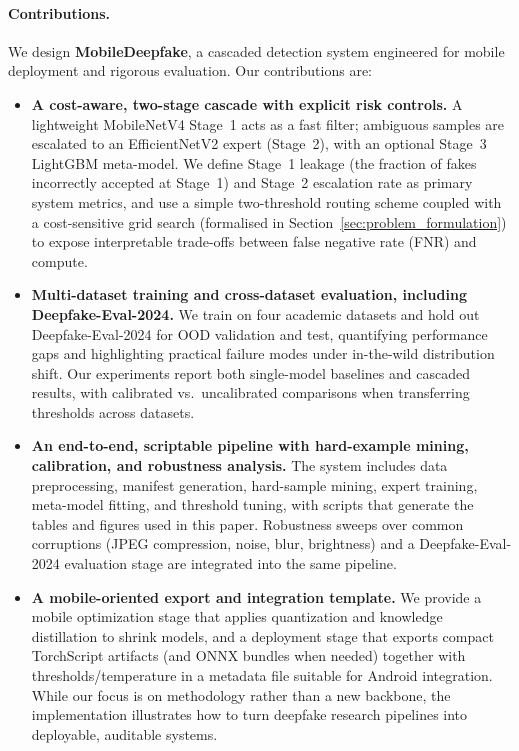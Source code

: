 \paragraph{Contributions.} We design \textbf{MobileDeepfake}, a cascaded detection system engineered for mobile deployment and rigorous evaluation. Our contributions are:
\begin{itemize}[leftmargin=*,itemsep=2pt,parsep=0pt]
  \item \textbf{A cost\hyp aware, two\hyp stage cascade with explicit risk controls.} A lightweight MobileNetV4 Stage~1 acts as a fast filter; ambiguous samples are escalated to an EfficientNetV2 expert (Stage~2), with an optional Stage~3 LightGBM meta\hyp model. We define Stage~1 leakage (the fraction of fakes incorrectly accepted at Stage~1) and Stage~2 escalation rate as primary system metrics, and use a simple two\hyp threshold routing scheme coupled with a cost\hyp sensitive grid search (formalised in Section~\ref{sec:problem_formulation}) to expose interpretable trade\hyp offs between false negative rate (FNR) and compute.
  \item \textbf{Multi\hyp dataset training and cross\hyp dataset evaluation, including Deepfake\hyp Eval\hyp 2024.} We train on four academic datasets and hold out Deepfake\hyp Eval\hyp 2024 for OOD validation and test, quantifying performance gaps and highlighting practical failure modes under in\hyp the\hyp wild distribution shift. Our experiments report both single\hyp model baselines and cascaded results, with calibrated vs.\ uncalibrated comparisons when transferring thresholds across datasets.
  \item \textbf{An end\hyp to\hyp end, scriptable pipeline with hard\hyp example mining, calibration, and robustness analysis.} The system includes data preprocessing, manifest generation, hard\hyp sample mining, expert training, meta\hyp model fitting, and threshold tuning, with scripts that generate the tables and figures used in this paper. Robustness sweeps over common corruptions (JPEG compression, noise, blur, brightness) and a Deepfake\hyp Eval\hyp 2024 evaluation stage are integrated into the same pipeline.
  \item \textbf{A mobile\hyp oriented export and integration template.} We provide a mobile optimization stage that applies quantization and knowledge distillation to shrink models, and a deployment stage that exports compact TorchScript artifacts (and ONNX bundles when needed) together with thresholds/temperature in a metadata file suitable for Android integration. While our focus is on methodology rather than a new backbone, the implementation illustrates how to turn deepfake research pipelines into deployable, auditable systems.
\end{itemize}

